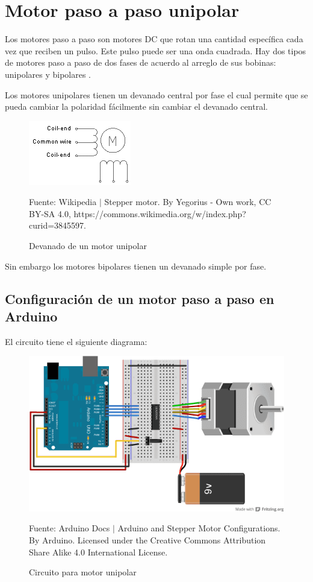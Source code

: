\documentclass[conference]{IEEEtran}
\begin{document}
\section{Motor paso a paso unipolar}

Los motores paso a paso son motores DC que rotan una cantidad específica cada vez que reciben un pulso. Este pulso puede ser una onda cuadrada. Hay dos tipos de motores paso a paso de dos fases de acuerdo al arreglo de sus bobinas: unipolares y bipolares \cite{wikipedia-stepper-motor-2022}.

\bigbreak

Los motores unipolares tienen un devanado central por fase el cual permite que se pueda cambiar la polaridad fácilmente sin cambiar el devanado central.

\begin{figure}[H]
\centering
\includegraphics[width=0.2\paperwidth]{images/unipolar-stepper-motor-windings}
\caption{Devanado de un motor unipolar}
\footnotesize
Fuente: Wikipedia $\mid$ Stepper motor. By Yegorius - Own work, CC BY-SA 4.0, https://commons.wikimedia.org/w/index.php?curid=3845597.
\end{figure}

Sin embargo los motores bipolares tienen un devanado simple por fase.

\subsection{Configuración de un motor paso a paso en Arduino}

El circuito tiene el siguiente diagrama:

\begin{figure}[H]
\centering
\includegraphics[width=0.3\paperwidth]{images/unipolar-knob-circuit}
\caption{Circuito para motor unipolar}
\footnotesize
Fuente: Arduino Docs $\mid$ Arduino and Stepper Motor Configurations. By Arduino. Licensed under the Creative Commons Attribution Share Alike 4.0
International License.
\end{figure}
\end{document}
